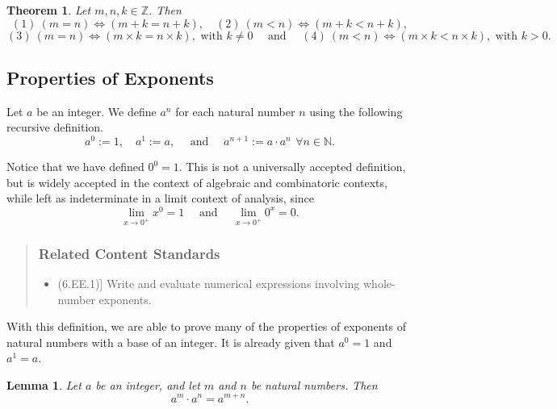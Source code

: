 \documentclass[
]{book}
\providecommand{\tightlist}{%
  \setlength{\itemsep}{0pt}\setlength{\parskip}{0pt}}
\newtheorem{theorem}{Theorem}[chapter]
\newtheorem{lemma}{Lemma}[chapter]
\theoremstyle{definition}
\theoremstyle{definition}
\theoremstyle{definition}
\theoremstyle{remark}
\begin{document}
\begin{theorem}
\protect\hypertarget{thm:unnamed-chunk-53}{}{\label{thm:unnamed-chunk-53} }Let \(m,n,k\in \mathbb{Z}\). Then \[(1) \: (m=n) \Leftrightarrow (m+k=n+k),  \quad (2) \: (m<n) \Leftrightarrow (m+k<n+k),\]
\[ (3) \: (m=n) \Leftrightarrow (m\times k=n\times k), \mbox{ with } k\neq 0 \quad \mbox{ and } \quad (4) \: (m<n) \Leftrightarrow (m\times k<n\times k), \mbox{ with } k> 0 .\]
\end{theorem}

\hypertarget{properties-of-exponents}{%
\subsection{Properties of Exponents}\label{properties-of-exponents}}

Let \(a\) be an integer. We define \(a^n\) for each natural number \(n\) using the following recursive definition.
\[a^0:=1, \quad a^1 := a, \quad \mbox{ and } \quad a^{n+1}:=a \cdot a^n\, \: \forall n\in \mathbb{N}.\]

Notice that we have defined \(0^0=1\). This is not a universally accepted definition, but is widely accepted in the context of algebraic and combinatoric contexts, while left as indeterminate in a limit context of analysis, since
\[\lim_{x\rightarrow 0^+} x^0 = 1 \quad \mbox{ and } \quad \lim_{x\rightarrow 0^+} 0^x = 0.\]

\begin{quote}
\hypertarget{related-content-standards-6}{%
\subsubsection*{Related Content Standards}\label{related-content-standards-6}}

\begin{itemize}
\tightlist
\item
  (6.EE.1){]} Write and evaluate numerical expressions involving whole-number exponents.
\end{itemize}
\end{quote}

With this definition, we are able to prove many of the properties of exponents of natural numbers with a base of an integer. It is already given that \(a^0=1\) and \(a^1=a\).

\begin{lemma}
\protect\hypertarget{lem:exponent-addition}{}{\label{lem:exponent-addition} }Let \(a\) be an integer, and let \(m\) and \(n\) be natural numbers. Then
\[a^m\cdot a^n=a^{m+n}.\]
\end{lemma}
\end{document}
